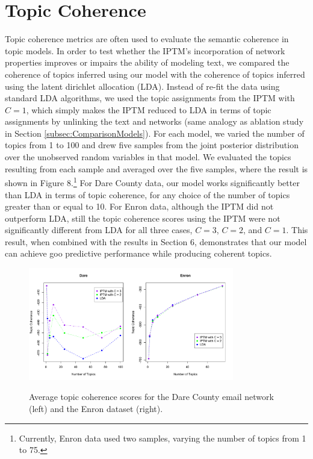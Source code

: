 \section{Topic Coherence} \label{sec:topiccoherence}
Topic coherence metrics \cite{mimno2011optimizing} are often used to evaluate the semantic coherence in topic models. In order to test whether the IPTM's incorporation of network properties improves or impairs the ability of modeling text, we compared the coherence of topics inferred using our model with the coherence of topics inferred using the latent dirichlet allocation (LDA). Instead of re-fit the data using standard LDA algorithms, we used the topic assignments from the IPTM with $C=1$, which simply makes the IPTM reduced to LDA in terms of topic assignments by unlinking the text and networks (same analogy as ablation study in Section \ref{subsec:ComparisonModels}). For each model, we varied the number of topics from 1 to 100 and drew five samples from the joint posterior distribution over the unobserved random variables in that model. We evaluated the topics resulting from each sample and averaged over the five samples, where the result is shown in Figure 8.\footnote{\noindent Currently, Enron data used two samples, varying the number of topics from 1 to 75.} For Dare County data, our model works significantly better than LDA in terms of topic coherence, for any choice of the number of topics greater than or equal to 10. For Enron data, although the IPTM did not outperform LDA, still the topic coherence scores using the IPTM were not significantly different from LDA for all three cases, $C=3$, $C=2$, and $C=1$. This result, when combined with the results in Section 6, demonstrates that our model can achieve goo predictive performance while producing coherent topics. 
\begin{figure}[H]
	\centering
	\includegraphics[width=0.8\textwidth]{plots/topic_coherence.pdf}  
	\label{fig:Daretopic}
	\caption{Average topic coherence scores for the Dare County email network (left) and the Enron dataset (right).}
\end{figure}


